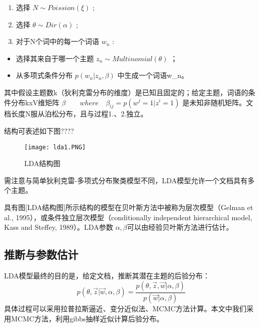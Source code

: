 \documentclass[]{article}
\providecommand{\tightlist}{%
  \setlength{\itemsep}{0pt}\setlength{\parskip}{0pt}}
\begin{document}
\begin{enumerate}
\def\labelenumi{\arabic{enumi}.}
\tightlist
\item
  选择 \(N \sim Poission(\xi)\) ;
\item
  选择 \(\theta\sim Dir(\alpha)\) ;
\item
  对于N个词中的每一个词语 \(w_n\) :
\end{enumerate}

\begin{itemize}
\tightlist
\item
  选择其来自于哪一个主题 \(z_n\sim Multinomial(\theta)\) ；
\item
  从多项式条件分布 \(p(w_n|z_n,\beta)\) 中生成一个词语w\_n。
\end{itemize}

其中假设主题数k（狄利克雷分布的维度）是已知且固定的；给定主题，词语的条件分布kxV维矩阵
\(\beta \qquad where \quad\beta_{ij}=p(w^j=1|z^i=1)\)
是未知非随机矩阵。文档长度N服从泊松分布，且与过程1.、2.独立。

结构可表述如下图????

\begin{figure}[htbp]
\centering
\texttt{[image: lda1.PNG]}
\caption{LDA结构图}
\end{figure}

需注意与简单狄利克雷-多项式分布聚类模型不同，LDA模型允许一个文档具有多个主题。

具有图{[}LDA结构图{]}所示结构的模型在贝叶斯方法中被称为层次模型（Gelman
et al., 1995），或条件独立层次模型（conditionally independent
hierarchical model, Kass and Steffey, 1989）。LDA参数
\(\alpha,\beta\)可以由经验贝叶斯方法进行估计。

\subsection{推断与参数估计}

LDA模型最终的目的是，给定文档，推断其潜在主题的后验分布：
\[p(\theta,\vec z|\vec w,\alpha,\beta)=\frac{p(\theta,\vec z,\vec w|\alpha,\beta)}{p(\vec w|\alpha,\beta)}\]
具体过程可以采用拉普拉斯逼近、变分近似法、MCMC方法计算。本文中我们采用MCMC方法，利用gibbs抽样近似计算后验分布。
\end{document}

